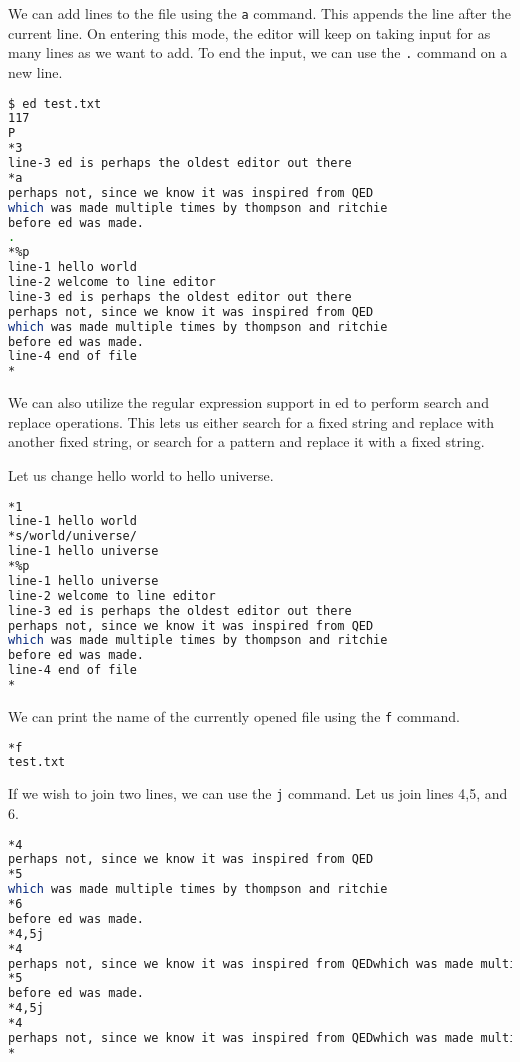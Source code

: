 We can add lines to the file using the \lstinline|a| command.
This appends the line after the current line.
On entering this mode, the editor will keep on taking
input for as many lines as we want to add.
To end the input, we can use the \lstinline|.| command on a new line.

\begin{lstlisting}[language=bash]
$ ed test.txt
117
P
*3
line-3 ed is perhaps the oldest editor out there
*a
perhaps not, since we know it was inspired from QED
which was made multiple times by thompson and ritchie
before ed was made.
.
*%p
line-1 hello world
line-2 welcome to line editor
line-3 ed is perhaps the oldest editor out there
perhaps not, since we know it was inspired from QED
which was made multiple times by thompson and ritchie
before ed was made.
line-4 end of file
*
\end{lstlisting}

We can also utilize the regular expression support
in ed to perform search and replace operations.
This lets us either search for a fixed string
and replace with another fixed string, or search
for a pattern and replace it with a fixed string.

Let us change hello world to hello universe.

\begin{lstlisting}[language=bash]
*1
line-1 hello world
*s/world/universe/
line-1 hello universe
*%p
line-1 hello universe
line-2 welcome to line editor
line-3 ed is perhaps the oldest editor out there
perhaps not, since we know it was inspired from QED
which was made multiple times by thompson and ritchie
before ed was made.
line-4 end of file
*
\end{lstlisting}

We can print the name of the currently opened file
using the \lstinline|f| command.

\begin{lstlisting}[language=bash]
*f
test.txt
\end{lstlisting}

If we wish to join two lines, we can use the \lstinline|j| command.
Let us join lines 4,5, and 6.

\begin{lstlisting}[language=bash]
*4
perhaps not, since we know it was inspired from QED
*5
which was made multiple times by thompson and ritchie
*6
before ed was made.
*4,5j
*4
perhaps not, since we know it was inspired from QEDwhich was made multiple times by thompson and ritchie
*5
before ed was made.
*4,5j
*4
perhaps not, since we know it was inspired from QEDwhich was made multiple times by thompson and ritchiebefore ed was made.
*
\end{lstlisting}

